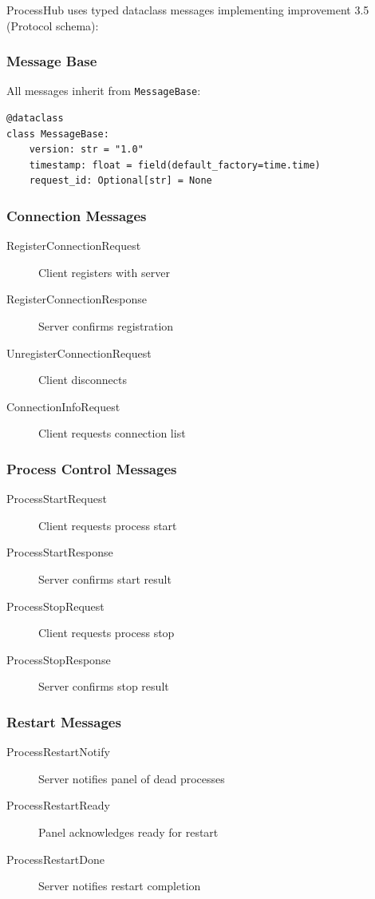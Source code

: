 ProcessHub uses typed dataclass messages implementing improvement 3.5 (Protocol schema):

\subsubsection{Message Base}

All messages inherit from \texttt{MessageBase}:

\begin{verbatim}
@dataclass
class MessageBase:
    version: str = "1.0"
    timestamp: float = field(default_factory=time.time)
    request_id: Optional[str] = None
\end{verbatim}

\subsubsection{Connection Messages}

\begin{description}
   \item[RegisterConnectionRequest] Client registers with server
   \item[RegisterConnectionResponse] Server confirms registration
   \item[UnregisterConnectionRequest] Client disconnects
   \item[ConnectionInfoRequest] Client requests connection list
\end{description}

\subsubsection{Process Control Messages}

\begin{description}
   \item[ProcessStartRequest] Client requests process start
   \item[ProcessStartResponse] Server confirms start result
   \item[ProcessStopRequest] Client requests process stop
   \item[ProcessStopResponse] Server confirms stop result
\end{description}

\subsubsection{Restart Messages}

\begin{description}
   \item[ProcessRestartNotify] Server notifies panel of dead processes
   \item[ProcessRestartReady] Panel acknowledges ready for restart
   \item[ProcessRestartDone] Server notifies restart completion
\end{description}

